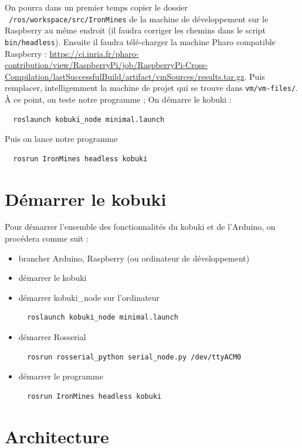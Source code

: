 \documentclass[a4paper, 11pt]{article}
\begin{document}
On pourra dans un premier temps copier le dossier
\texttt{~/ros/workspace/src/IronMines} de la machine de développement
sur le Raspberry au même endroit (il faudra corriger les chemins dans
le script \texttt{bin/headless}). Ensuite il faudra télé-charger la
machine Pharo compatible Raspberry :
\url{https://ci.inria.fr/pharo-contribution/view/RaspberryPi/job/RaspberryPi-Cross-Compilation/lastSuccessfulBuild/artifact/vmSources/results.tar.gz}.
Puis remplacer, intelligemment la machine de projet qui se trouve dans
\texttt{vm/vm-files/}.
À ce point, on teste notre programme ; On démarre le kobuki :
\begin{verbatim}
  roslaunch kobuki_node minimal.launch
\end{verbatim}
Puis on lance notre programme
\begin{verbatim}
  rosrun IronMines headless kobuki
\end{verbatim}

\section{Démarrer le kobuki}

Pour démarrer l'ensemble des fonctionnalités du kobuki et de
l'Arduino, on procédera comme suit :
\begin{itemize}
\item brancher Arduino, Raspberry (ou ordinateur de développement)
\item démarrer le kobuki
\item démarrer kobuki\_node sur l'ordinateur
\begin{verbatim}
  roslaunch kobuki_node minimal.launch
\end{verbatim}
\item démarrer Rosserial
\begin{verbatim}
  rosrun rosserial_python serial_node.py /dev/ttyACM0
\end{verbatim}
\item démarrer le programme
\begin{verbatim}
  rosrun IronMines headless kobuki
\end{verbatim}
\end{itemize}


\section{Architecture}
\end{document}

